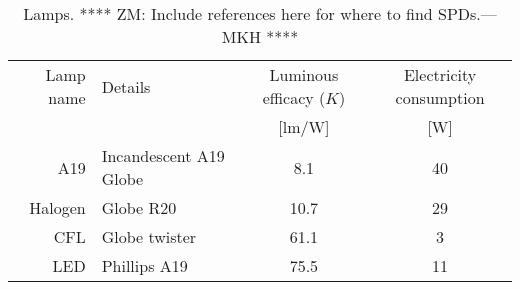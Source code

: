 

\begin{table}
\centering %
\caption{Lamps. **** ZM: Include references here for where to find SPDs.---MKH ****}
\begin{tabular}{r l c c}
  \toprule
  Lamp name 
      & Details 
      & Luminous efficacy ($K$)  
      & Electricity consumption \\
  
      &
      & [lm/W]
      & [W] \\
  \midrule
  A19    
      & Incandescent A19 Globe
      & 8.1
      & 40 \\
  Halogen
      & Globe R20
      & 10.7
      & 29 \\
  CFL
      & Globe twister
      & 61.1
      & 3 \\
  LED
      & Phillips A19
      & 75.5
      & 11 \\
  \bottomrule
\end{tabular}
\label{tab:lamps}
\end{table}

